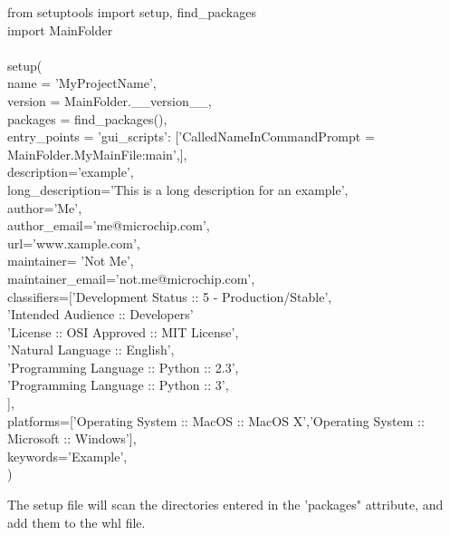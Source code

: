 \documentclass[10pt,letterpaper]{article}
\begin{document}
\begin{mdframed}[backgroundcolor=black, fontcolor=white]
from setuptools import setup, find\_packages\\
import MainFolder\\
   \\\indent setup(\\
     \indent\indent name = 'MyProjectName',\\
     \indent\indent version = MainFolder.\_\_version\_\_,\\
     \indent\indent packages = find\_packages(),\\
     \indent\indent entry\_points = {'gui\_scripts': ['CalledNameInCommandPrompt = MainFolder.MyMainFile:main',]},\\
      \indent\indent description='example',\\
      \indent\indent long\_description='This is a long description for an example',\\
      \indent\indent author='Me',\\
      \indent\indent author\_email='me@microchip.com',\\
      \indent\indent url='www.xample.com',\\
      \indent\indent maintainer= 'Not Me',\\
      \indent\indent maintainer\_email='not.me@microchip.com',\\
      \indent\indent classifiers=['Development Status :: 5 - Production/Stable',\\
                   \indent\indent\indent 'Intended Audience :: Developers'\\
                   \indent\indent\indent  'License :: OSI Approved :: MIT License',\\
                    \indent\indent\indent 'Natural Language :: English',\\
                    \indent\indent\indent  'Programming Language :: Python :: 2.3',\\
                    \indent\indent\indent 'Programming Language :: Python :: 3',\\
                    \indent\indent\indent ],\\
       \indent\indent platforms=['Operating System :: MacOS :: MacOS X','Operating System :: Microsoft :: Windows'],\\
       \indent\indent keywords='Example',\\
      \indent)
\end{mdframed}
The setup file will scan the directories entered in the 'packages" attribute, and add them to the whl file.\\
\end{document}
